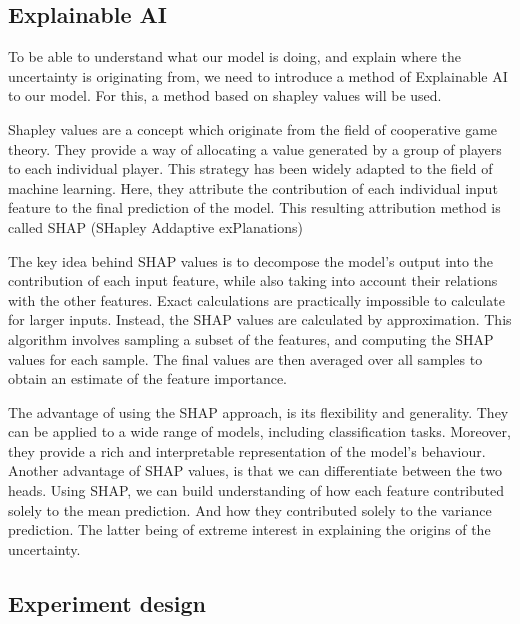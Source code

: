 \subsection{Explainable AI}

To be able to understand what our model is doing, and explain where the uncertainty is originating from, we need to introduce a method of Explainable AI to our model. For this, a method based on shapley values will be used.

Shapley values are a concept which originate from the field of cooperative game theory. They provide a way of allocating a value generated by a group of players to each individual player. This strategy has been widely adapted to the field of machine learning. Here, they attribute the contribution of each individual input feature to the final prediction of the model. This resulting attribution method is called SHAP (SHapley Addaptive exPlanations)

The key idea behind SHAP values is to decompose the model's output into the contribution of each input feature, while also taking into account their relations with the other features. Exact calculations are practically impossible to calculate for larger inputs. Instead, the SHAP values are calculated by approximation. This algorithm involves sampling a subset of the features, and computing the SHAP values for each sample. The final values are then averaged over all samples to obtain an estimate of the feature importance.

The advantage of using the SHAP approach, is its flexibility and generality. They can be applied to a wide range of models, including classification tasks. Moreover, they provide a rich and interpretable representation of the model's behaviour. Another advantage of SHAP values, is that we can differentiate between the two heads. Using SHAP, we can build understanding of how each feature contributed solely to the mean prediction. And how they contributed solely to the variance prediction. The latter being of extreme interest in explaining the origins of the uncertainty. 

\subsection{Experiment design}

